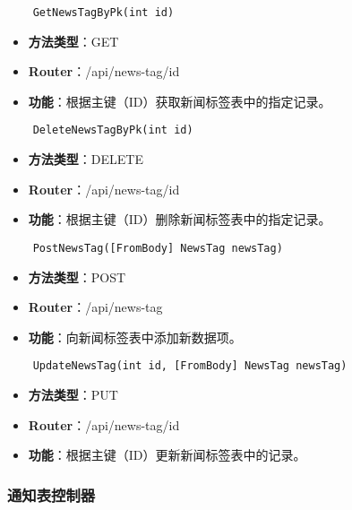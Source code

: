 \begin{verbatim}
	GetNewsTagByPk(int id)
\end{verbatim}

\begin{itemize}
	\item \textbf{方法类型}：GET
	\item \textbf{Router}：/api/news-tag/{id}
	\item \textbf{功能}：根据主键（ID）获取新闻标签表中的指定记录。
\end{itemize}

\begin{verbatim}
	DeleteNewsTagByPk(int id)
\end{verbatim}

\begin{itemize}
	\item \textbf{方法类型}：DELETE
	\item \textbf{Router}：/api/news-tag/{id}
	\item \textbf{功能}：根据主键（ID）删除新闻标签表中的指定记录。
\end{itemize}

\begin{verbatim}
	PostNewsTag([FromBody] NewsTag newsTag)
\end{verbatim}

\begin{itemize}
	\item \textbf{方法类型}：POST
	\item \textbf{Router}：/api/news-tag
	\item \textbf{功能}：向新闻标签表中添加新数据项。
\end{itemize}

\begin{verbatim}
	UpdateNewsTag(int id, [FromBody] NewsTag newsTag)
\end{verbatim}

\begin{itemize}
	\item \textbf{方法类型}：PUT
	\item \textbf{Router}：/api/news-tag/{id}
	\item \textbf{功能}：根据主键（ID）更新新闻标签表中的记录。
\end{itemize}

\subsubsection{通知表控制器}

